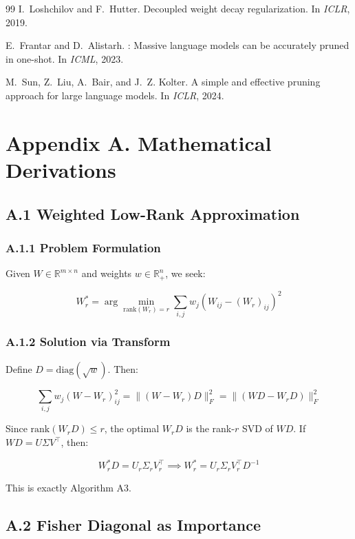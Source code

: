 \begin{thebibliography}{99}
I.~Loshchilov and F.~Hutter.
\newblock Decoupled weight decay regularization.
\newblock In \emph{ICLR}, 2019.

E.~Frantar and D.~Alistarh.
: Massive language models can be accurately pruned in one-shot.
\newblock In \emph{ICML}, 2023.

M.~Sun, Z.~Liu, A.~Bair, and J.~Z. Kolter.
\newblock A simple and effective pruning approach for large language models.
\newblock In \emph{ICLR}, 2024.

\end{thebibliography}


\section{Appendix A. Mathematical Derivations}

\subsection{A.1 Weighted Low-Rank Approximation}

\subsubsection{A.1.1 Problem Formulation}

Given $W \in \mathbb{R}^{m \times n}$ and weights $w \in \mathbb{R}_+^n$, 
we seek:

\[
W_r^* = \arg\min_{\text{rank}(W_r) = r} \sum_{i, j} w_j (W_{ij} - (W_r)_{ij})^2
\tag{A.1}
\]

\subsubsection{A.1.2 Solution via Transform}

Define $D = \mathrm{diag}(\sqrt{w})$. Then:

\[
\sum_{i, j} w_j (W - W_r)_{ij}^2 = \|(W - W_r) D\|_F^2 = \|(W D - W_r D)\|_F^2
\tag{A.2}
\]

Since $\text{rank}(W_r D) \leq r$, the optimal $W_r D$ is the rank-$r$ SVD 
of $W D$. If $W D = U \Sigma V^\top$, then:

\[
W_r^* D = U_r \Sigma_r V_r^\top \implies W_r^* = U_r \Sigma_r V_r^\top D^{-1}
\tag{A.3}
\]

This is exactly Algorithm A3.

\subsection{A.2 Fisher Diagonal as Importance}

